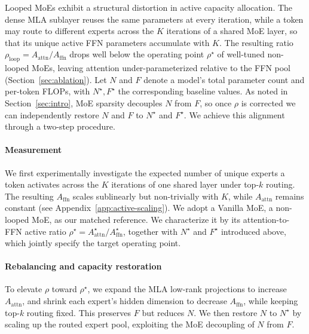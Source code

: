 Looped MoEs exhibit a structural distortion in active capacity allocation. The dense MLA sublayer reuses the same parameters at every iteration, while a token may route to different experts across the $K$ iterations of a shared MoE layer, so that its unique active FFN parameters accumulate with $K$. The resulting ratio $\rho_{\text{loop}} = A_{\text{attn}}/A_{\text{ffn}}$ drops well below the operating point $\rho^\star$ of well-tuned non-looped MoEs, leaving attention under-parameterized relative to the FFN pool (Section~\ref{sec:ablation}). Let $N$ and $F$ denote a model's total parameter count and per-token FLOPs, with $N^\star, F^\star$ the corresponding baseline values. As noted in Section~\ref{sec:intro}, MoE sparsity decouples $N$ from $F$, so once $\rho$ is corrected we can independently restore $N$ and $F$ to $N^\star$ and $F^\star$. We achieve this alignment through a two-step procedure.

\paragraph{Measurement}
We first experimentally investigate the expected number of unique experts a token activates across the $K$ iterations of one shared layer under top-$k$ routing. The resulting $A_{\text{ffn}}$ scales sublinearly but non-trivially with $K$, while $A_{\text{attn}}$ remains constant (see Appendix~\ref{app:active-scaling}). We adopt a Vanilla MoE, a non-looped MoE, as our matched reference. We characterize it by its attention-to-FFN active ratio $\rho^\star = A^\star_{\text{attn}}/A^\star_{\text{ffn}}$, together with $N^\star$ and $F^\star$ introduced above, which jointly specify the target operating point.

\paragraph{Rebalancing and capacity restoration}
To elevate $\rho$ toward $\rho^\star$, we expand the MLA low-rank projections to increase $A_{\mathrm{attn}}$, and shrink each expert's hidden dimension to decrease $A_{\mathrm{ffn}}$, while keeping top-$k$ routing fixed. This preserves $F$ but reduces $N$. We then restore $N$ to $N^\star$ by scaling up the routed expert pool, exploiting the MoE decoupling of $N$ from $F$.